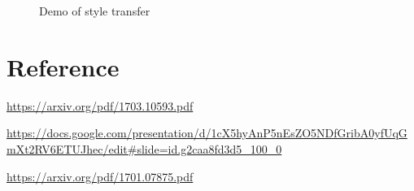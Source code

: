 \documentclass[10pt, a4paper]{article}
\begin{document}
\begin{CJK}{UTF8}{bkai}
\begin{figure}
\centering
{}
\hfill
{}
\hfill
\caption{Demo of style transfer}
\label{fig:f10}
\end{figure}

\section{Reference}
\noindent

\url{https://arxiv.org/pdf/1703.10593.pdf}\par
\url{https://docs.google.com/presentation/d/1cX5hyAnP5nEsZO5NDfGribA0yfUqGmXt2RV6ETUJhec/edit#slide=id.g2caa8fd3d5_100_0}\par
\url{https://arxiv.org/pdf/1701.07875.pdf}\par

\end{CJK}
\end{document}
